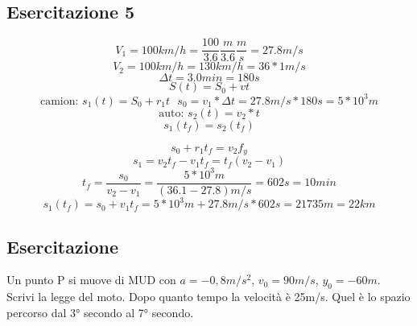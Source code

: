 \subsection{Esercitazione 5}
	\begin{equation*}
		V_1=100km/h=\frac{100}{3.6}\frac{m}{3.6}\frac{m}{s}=27.8m/s
	\end{equation*}
	\begin{equation*}
		V_2=100km/h=130km/h=36*1m/s
	\end{equation*}
	\begin{equation*}
		\Delta t=3.0min=180s
	\end{equation*}
	\begin{equation*}
		S(t)=S_0+vt
	\end{equation*}
	\begin{equation*}
		\text{camion: } s_1(t)=S_0+r_1t \text{ } s_0=v_1*\Delta
		t=27.8m/s*180s=5*10^3m
	\end{equation*}
	\begin{equation*}
		\text{auto: } s_2(t)=v_2*t
	\end{equation*}
	\begin{equation*}
		s_1(t_f)=s_2(t_f)
	\end{equation*}
\begin{multicols}{2}
	\begin{equation*}
		s_0+r_1t_f=v_2f_y
	\end{equation*}
	\begin{equation*}
		s_1=v_2t_f-v_1t_f=t_f(v_2-v_1)
	\end{equation*}
	\begin{equation*}
		\boxed{t_f=\frac{s_0}{v_2-v_1}}=\frac{5*10^3m}{(36.1-27.8)m/s}=602s=10min
	\end{equation*}
	\begin{equation*}
		s_1(t_f)=s_0+v_1t_f=5*10^3m+27.8m/s*602s=21735m=22km
	\end{equation*}

\end{multicols}
\subsection{Esercitazione}
Un punto P si muove di MUD con $a=-0,8m/s^2$, $v_0=90m/s$, $y_0=-60m$. Scrivi
la legge del moto. Dopo quanto tempo la velocità è 25m/s. Quel è lo spazio
percorso dal 3° secondo al 7° secondo.
